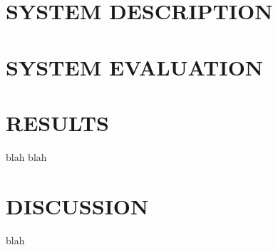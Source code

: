 \documentclass{article}
\begin{document}
\section{SYSTEM DESCRIPTION}

\section{SYSTEM EVALUATION}


\section{RESULTS}
blah blah

\section{DISCUSSION}
blah






\end{document}

